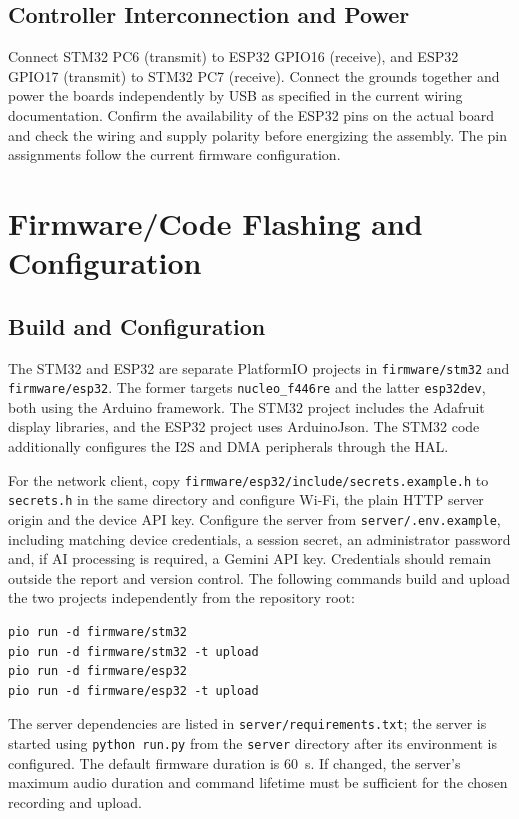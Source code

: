 \subsection{Controller Interconnection and Power}
Connect STM32 PC6 (transmit) to ESP32 GPIO16 (receive), and ESP32 GPIO17 (transmit) to STM32 PC7 (receive). Connect the grounds together and power the boards independently by USB as specified in the current wiring documentation. Confirm the availability of the ESP32 pins on the actual board and check the wiring and supply polarity before energizing the assembly. The pin assignments follow the current firmware configuration.

\section{Firmware/Code Flashing and Configuration}
\subsection{Build and Configuration}
The STM32 and ESP32 are separate PlatformIO projects in \texttt{firmware/stm32} and \texttt{firmware/esp32}. The former targets \texttt{nucleo\_f446re} and the latter \texttt{esp32dev}, both using the Arduino framework. The STM32 project includes the Adafruit display libraries, and the ESP32 project uses ArduinoJson. The STM32 code additionally configures the I2S and DMA peripherals through the HAL.

For the network client, copy \texttt{firmware/esp32/include/secrets.example.h} to \texttt{secrets.h} in the same directory and configure Wi-Fi, the plain HTTP server origin and the device API key. Configure the server from \texttt{server/.env.example}, including matching device credentials, a session secret, an administrator password and, if AI processing is required, a Gemini API key. Credentials should remain outside the report and version control. The following commands build and upload the two projects independently from the repository root:
\begin{verbatim}
pio run -d firmware/stm32
pio run -d firmware/stm32 -t upload
pio run -d firmware/esp32
pio run -d firmware/esp32 -t upload
\end{verbatim}
The server dependencies are listed in \texttt{server/requirements.txt}; the server is started using \texttt{python run.py} from the \texttt{server} directory after its environment is configured. The default firmware duration is 60~s. If changed, the server's maximum audio duration and command lifetime must be sufficient for the chosen recording and upload.

